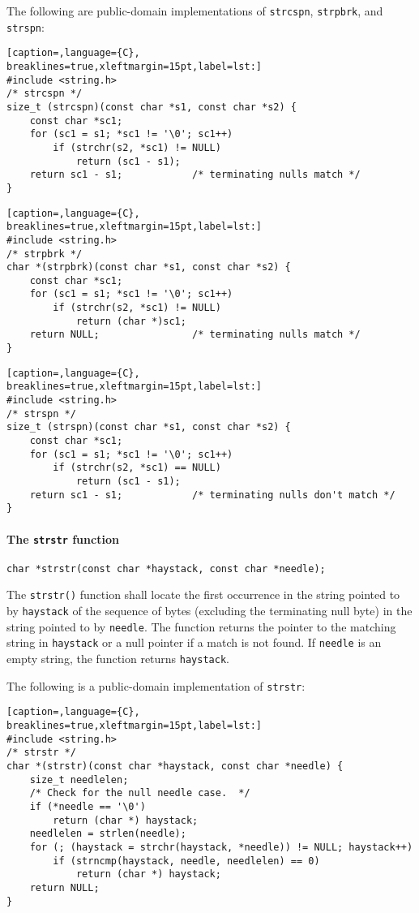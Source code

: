 The following are public-domain implementations of \texttt{strcspn},
\texttt{strpbrk}, and \texttt{strspn}:
\lstset{basicstyle=\scriptsize, numbers=left, captionpos=b, tabsize=4}
\begin{lstlisting}[caption=,language={C},
breaklines=true,xleftmargin=15pt,label=lst:]
#include <string.h>
/* strcspn */
size_t (strcspn)(const char *s1, const char *s2) {
	const char *sc1;
	for (sc1 = s1; *sc1 != '\0'; sc1++)
		if (strchr(s2, *sc1) != NULL)
			return (sc1 - s1);
	return sc1 - s1;			/* terminating nulls match */
}
\end{lstlisting}

\lstset{basicstyle=\scriptsize, numbers=left, captionpos=b, tabsize=4}
\begin{lstlisting}[caption=,language={C},
breaklines=true,xleftmargin=15pt,label=lst:]
#include <string.h>
/* strpbrk */
char *(strpbrk)(const char *s1, const char *s2) {
	const char *sc1;
	for (sc1 = s1; *sc1 != '\0'; sc1++)
		if (strchr(s2, *sc1) != NULL)
			return (char *)sc1;
	return NULL;				/* terminating nulls match */
}
\end{lstlisting}

\lstset{basicstyle=\scriptsize, numbers=left, captionpos=b, tabsize=4}
\begin{lstlisting}[caption=,language={C},
breaklines=true,xleftmargin=15pt,label=lst:]
#include <string.h>
/* strspn */
size_t (strspn)(const char *s1, const char *s2) {
	const char *sc1;
	for (sc1 = s1; *sc1 != '\0'; sc1++)
		if (strchr(s2, *sc1) == NULL)
			return (sc1 - s1);
	return sc1 - s1;			/* terminating nulls don't match */
}
\end{lstlisting}

\paragraph{The \texttt{strstr} function}
\texttt{char *strstr(const char *haystack, const char *needle);}

The \texttt{strstr()} function shall locate the first occurrence in the string
pointed to by \texttt{haystack} of the sequence of bytes (excluding the
terminating null byte) in the string pointed to by \texttt{needle}. The
function returns the pointer to the matching string in \texttt{haystack} or a
null pointer if a match is not found. If \texttt{needle} is an empty string,
the function returns \texttt{haystack}.

The following is a public-domain implementation of \texttt{strstr}:
\lstset{basicstyle=\scriptsize, numbers=left, captionpos=b, tabsize=4}
\begin{lstlisting}[caption=,language={C},
breaklines=true,xleftmargin=15pt,label=lst:]
#include <string.h>
/* strstr */
char *(strstr)(const char *haystack, const char *needle) {
	size_t needlelen;
	/* Check for the null needle case.  */
	if (*needle == '\0')
		return (char *) haystack;
	needlelen = strlen(needle);
	for (; (haystack = strchr(haystack, *needle)) != NULL; haystack++)
		if (strncmp(haystack, needle, needlelen) == 0)
			return (char *) haystack;
	return NULL;
}
\end{lstlisting}

